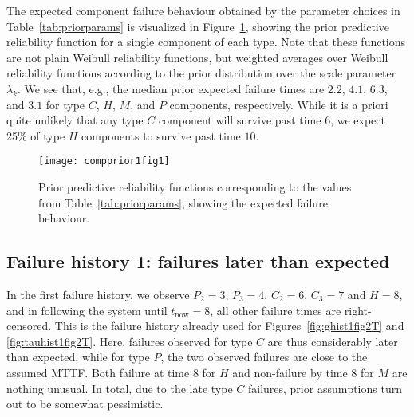 \documentclass[authoryear]{elsarticle}
\def\tnow{t_\text{now}}
\begin{document}
The expected component failure behaviour obtained by the parameter choices in Table~\ref{tab:priorparams}
is visualized in Figure~\ref{fig:compprior1fig1},
showing the prior predictive reliability function for a single component of each type.
Note that these functions are not plain Weibull reliability functions,
but weighted averages over Weibull reliability functions according to the prior distribution over the scale parameter $\lambda_k$.
We see that, e.g., the median prior expected failure times are
$2.2$, $4.1$, $6.3$, and $3.1$ for type $C$, $H$, $M$, and $P$ components, respectively.
While it is a priori quite unlikely that any type $C$ component will survive past time $6$,
we expect 25\% of type $H$ components to survive past time $10$.

\begin{figure}
\centering
\texttt{[image: compprior1fig1]}
\caption{Prior predictive reliability functions corresponding to the values from Table~\ref{tab:priorparams},
showing the expected failure behaviour.}
\label{fig:compprior1fig1}
\end{figure}


\subsection{Failure history 1: failures later than expected}
\label{sec:ex-1}

In the first failure history, we observe
$P_2 = 3$, $P_3 = 4$, $C_2 = 6$, $C_3 = 7$ and $H = 8$,
and in following the system until $\tnow = 8$,
all other failure times are right-censored.
This is the failure history already used for Figures~\ref{fig:ghist1fig2T} and \ref{fig:tauhist1fig2T}.
Here, failures observed for type $C$ are thus considerably later than expected,
while for type $P$, the two observed failures are close to the assumed MTTF. 
Both failure at time $8$ for $H$ and non-failure by time $8$ for $M$ are nothing unusual.
In total, due to the late type $C$ failures, prior assumptions turn out to be somewhat pessimistic.
\end{document}
